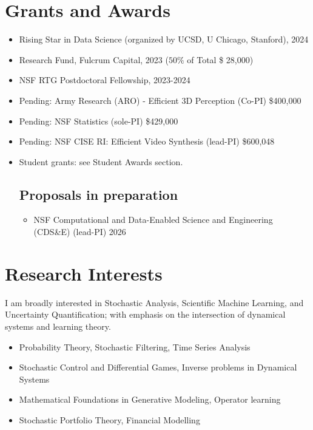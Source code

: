 \documentclass[11pt,a4paper,roman]{moderncv}
\begin{document}
\section{Grants and Awards }
\begin{itemize}
\item Rising Star in Data Science (organized by UCSD, U Chicago, Stanford), 2024
\vspace{1pt}
    \item Research Fund, Fulcrum Capital, 2023  ($50 \%$ of Total \$ 28,000)
    \vspace{1pt}
    \item NSF RTG Postdoctoral Fellowship, 2023-2024
    \vspace{1pt}
    \item Pending: Army Research (ARO) - Efficient 3D Perception (Co-PI) \$400,000 
    \item Pending: NSF Statistics (sole-PI) \$429,000
    \item Pending: NSF CISE RI: Efficient Video Synthesis (lead-PI)  \$600,048

    \item Student grants: see Student Awards section.

\subsection{Proposals in preparation}

\begin{itemize}
\item NSF Computational and Data-Enabled Science and Engineering (CDS\&E) (lead-PI) 2026
% 
\end{itemize}


\end{itemize}



\section{Research Interests}
I am broadly interested in Stochastic Analysis, Scientific Machine Learning, and Uncertainty Quantification; with emphasis on the intersection of dynamical systems and learning theory. 
\begin{itemize}
    \item Probability Theory, Stochastic Filtering, Time Series Analysis
    \item Stochastic Control and Differential Games, Inverse problems in Dynamical Systems
    \item Mathematical Foundations in Generative Modeling, Operator learning
    \item Stochastic Portfolio Theory, Financial Modelling

    
\end{itemize}
\end{document}
